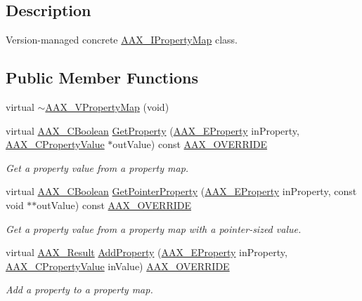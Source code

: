 \subsection{Description}
Version-\/managed concrete \hyperlink{a00112}{A\+A\+X\+\_\+\+I\+Property\+Map} class. \subsection*{Public Member Functions}
\begin{DoxyCompactItemize}
\item 
virtual \hyperlink{a00140_a861770223c13a82fbfa2f5de7a0d4914}{$\sim$\+A\+A\+X\+\_\+\+V\+Property\+Map} (void)
\item 
virtual \hyperlink{a00149_aa216506530f1d19a2965931ced2b274b}{A\+A\+X\+\_\+\+C\+Boolean} \hyperlink{a00140_acdfa239fa3855fbd9b479165162ab1b1}{Get\+Property} (\hyperlink{a00283_a6571f4e41a5dd06e4067249228e2249e}{A\+A\+X\+\_\+\+E\+Property} in\+Property, \hyperlink{a00149_ab247c0d8686c14e05cbb567ef276f249}{A\+A\+X\+\_\+\+C\+Property\+Value} $\ast$out\+Value) const \hyperlink{a00149_ac2f24a5172689ae684344abdcce55463}{A\+A\+X\+\_\+\+O\+V\+E\+R\+R\+I\+D\+E}
\begin{DoxyCompactList}\small\item\em Get a property value from a property map. \end{DoxyCompactList}\item 
virtual \hyperlink{a00149_aa216506530f1d19a2965931ced2b274b}{A\+A\+X\+\_\+\+C\+Boolean} \hyperlink{a00140_a654769c66d012f97743b2ca074775e8b}{Get\+Pointer\+Property} (\hyperlink{a00283_a6571f4e41a5dd06e4067249228e2249e}{A\+A\+X\+\_\+\+E\+Property} in\+Property, const void $\ast$$\ast$out\+Value) const \hyperlink{a00149_ac2f24a5172689ae684344abdcce55463}{A\+A\+X\+\_\+\+O\+V\+E\+R\+R\+I\+D\+E}
\begin{DoxyCompactList}\small\item\em Get a property value from a property map with a pointer-\/sized value. \end{DoxyCompactList}\item 
virtual \hyperlink{a00149_a4d8f69a697df7f70c3a8e9b8ee130d2f}{A\+A\+X\+\_\+\+Result} \hyperlink{a00140_ad66bb0c14572a6d550d7774a4d50ec38}{Add\+Property} (\hyperlink{a00283_a6571f4e41a5dd06e4067249228e2249e}{A\+A\+X\+\_\+\+E\+Property} in\+Property, \hyperlink{a00149_ab247c0d8686c14e05cbb567ef276f249}{A\+A\+X\+\_\+\+C\+Property\+Value} in\+Value) \hyperlink{a00149_ac2f24a5172689ae684344abdcce55463}{A\+A\+X\+\_\+\+O\+V\+E\+R\+R\+I\+D\+E}
\begin{DoxyCompactList}\small\item\em Add a property to a property map. \end{DoxyCompactList}\item 
$$
\end{DoxyCompactItemize}
